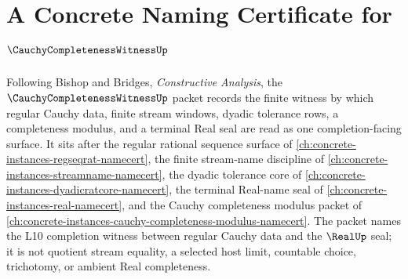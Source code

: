 \chapter{A Concrete Naming Certificate for $\CauchyCompletenessWitnessUp$}
\label{ch:concrete-instances-cauchy-completeness-witness-namecert}

Following Bishop and Bridges, \emph{Constructive Analysis}, the $\CauchyCompletenessWitnessUp$ packet records the finite witness by which regular Cauchy data, finite stream windows, dyadic tolerance rows, a completeness modulus, and a terminal Real seal are read as one completion-facing surface. It sits after the regular rational sequence surface of \autoref{ch:concrete-instances-regseqrat-namecert}, the finite stream-name discipline of \autoref{ch:concrete-instances-streamname-namecert}, the dyadic tolerance core of \autoref{ch:concrete-instances-dyadicratcore-namecert}, the terminal Real-name seal of \autoref{ch:concrete-instances-real-namecert}, and the Cauchy completeness modulus packet of \autoref{ch:concrete-instances-cauchy-completeness-modulus-namecert}. The packet names the L10 completion witness between regular Cauchy data and the $\RealUp$ seal; it is not quotient stream equality, a selected host limit, countable choice, trichotomy, or ambient Real completeness.


